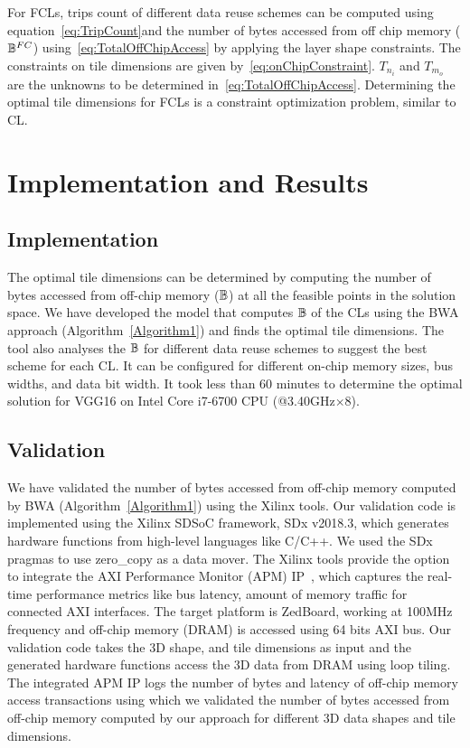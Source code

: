 For FCLs, trips count of different data reuse schemes can be computed using equation~\ref{eq:TripCount}and the number of bytes accessed from off chip memory ($\mathbb{B}^{FC}$) using~\eqref{eq:TotalOffChipAccess} by applying the layer shape constraints. The constraints on tile dimensions are given by~\eqref{eq:onChipConstraint}. $T_{n_i}$ and $T_{m_o}$ are the unknowns to be determined in~\eqref{eq:TotalOffChipAccess}. Determining the optimal tile dimensions for FCLs is a constraint optimization problem, similar to CL.
\section{Implementation and Results}
\subsection{Implementation}
The optimal tile dimensions can be determined by computing the number of bytes accessed from off-chip memory ($\mathbb{B}$) at all the feasible points in the solution space. 
We have developed the model that computes $\mathbb{B}$ of the CLs using the BWA approach (Algorithm~\ref{Algorithm1}) and finds the optimal tile dimensions. The tool also analyses the $\mathbb{B}$ for different data reuse schemes to suggest the best scheme for each CL. It can be configured for different on-chip memory sizes, bus widths, and data bit width. It took less than 60 minutes to determine the optimal solution for VGG16 on Intel Core i7-6700 CPU (@3.40GHz$\times$8).
\subsection{Validation}\label{Validation}
We have validated the number of bytes accessed from off-chip memory computed by BWA (Algorithm~\ref{Algorithm1}) using the Xilinx tools. Our validation code is implemented using the Xilinx SDSoC framework, SDx v2018.3, which generates hardware functions from high-level languages like C/C++. We used the SDx pragmas to use zero\_copy as a data mover. The Xilinx tools provide the option to integrate the AXI Performance Monitor (APM) IP~\cite{APM}, which captures the real-time performance metrics like bus latency, amount of memory traffic for connected AXI interfaces. The target platform is ZedBoard, working at 100MHz frequency and off-chip memory (DRAM) is accessed using 64 bits AXI bus. 
Our validation code takes the 3D shape, and tile dimensions as input and the generated hardware functions access the 3D data from DRAM using loop tiling. The integrated APM IP logs the number of bytes and latency of off-chip memory access transactions using which we validated the number of bytes accessed from off-chip memory computed by our approach for different 3D data shapes and tile dimensions.
